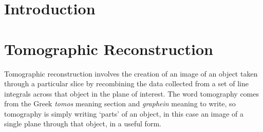 
\section{Introduction} %
	\label{sec:introduction}


\section{Tomographic Reconstruction} %
	\label{sec:tomographic_reconstruction}
	Tomographic reconstruction involves the creation of an image of an object taken through a particular slice by recombining the data collected from a set of line integrals across that object in the plane of interest. The word tomography comes from the Greek \textit{tomos} meaning section and \textit{graphein} meaning to write, so tomography is simply writing `parts' of an object, in this case an image of a single plane through that object, in a useful form.

